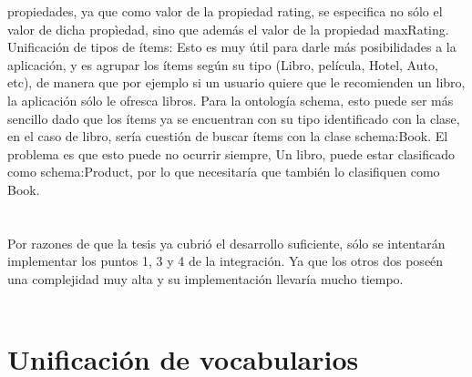 propiedades, ya que como valor de la propiedad rating, se especifica no sólo el valor de dicha propìedad, sino que además el valor de la 
propiedad maxRating. \\
Unificación de tipos de ítems: Esto es muy útil para darle más posibilidades a la aplicación, y es agrupar los ítems según su tipo 
(Libro, película, Hotel, Auto, etc), de manera que por ejemplo si un usuario quiere que le recomienden un libro, la aplicación sólo 
le ofresca libros. Para la ontología schema, esto puede ser más sencillo dado que los ítems ya se encuentran con su tipo identificado con 
la clase, en el caso de libro, sería cuestión de buscar ítems con la clase schema:Book. El problema es que esto puede no ocurrir siempre, 
Un libro, puede estar clasificado como schema:Product, por lo que necesitaría que también lo clasifiquen como Book.\\
\\
\\
Por razones de que la tesis ya cubrió el desarrollo suficiente, sólo se intentarán implementar los puntos 1, 3 y 4 de la integración. Ya que 
los otros dos poseén una complejidad muy alta y su implementación llevaría mucho tiempo.\\
\\
\section{Unificación de vocabularios}
\label{section:unificacion-vocabularios}

